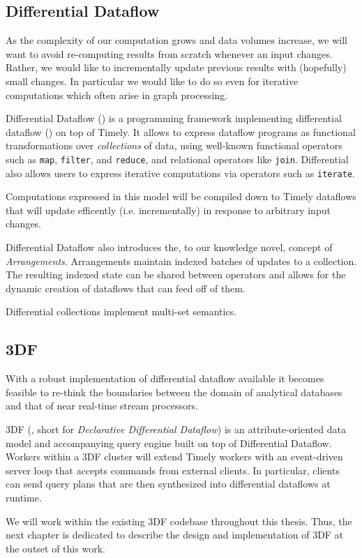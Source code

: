 \documentclass[../index.tex]{subfiles}
\begin{document}
\subsection{Differential Dataflow}

As the complexity of our computation grows and data volumes increase,
we will want to avoid re-computing results from scratch whenever an
input changes. Rather, we would like to incrementally update previous
results with (hopefully) small changes. In particular we would like to
do so even for iterative computations which often arise in graph
processing.

Differential Dataflow (\cite{differential}) is a programming framework
implementing differential dataflow (\cite{mcsherry2013differential})
on top of Timely. It allows to express dataflow programs as functional
transformations over \emph{collections} of data, using well-known
functional operators such as \texttt{map}, \texttt{filter}, and
\texttt{reduce}, and relational operators like
\texttt{join}. Differential also allows users to express iterative
computations via operators such as \texttt{iterate}.

Computations expressed in this model will be compiled down to Timely
dataflows that will update efficently (i.e. incrementally) in response
to arbitrary input changes.

Differential Dataflow also introduces the, to our knowledge novel,
concept of \emph{Arrangements}. Arrangements maintain indexed batches
of updates to a collection. The resulting indexed state can be shared
between operators and allows for the dynamic creation of dataflows
that can feed off of them.

Differential collections implement multi-set semantics.

\subsection{3DF}

With a robust implementation of differential dataflow available it
becomes feasible to re-think the boundaries between the domain of
analytical databases and that of near real-time stream processors.

3DF (\cite{declarative}, short for \emph{Declarative Differential
  Dataflow}) is an attribute-oriented data model and accompanying
query engine built on top of Differential Dataflow. Workers within a
3DF cluster will extend Timely workers with an event-driven server
loop that accepts commands from external clients. In particular,
clients can send query plans that are then synthesized into
differential dataflows at runtime.

We will work within the existing 3DF codebase throughout this
thesis. Thus, the next chapter is dedicated to describe the design and
implementation of 3DF at the outset of this work.
\end{document}
